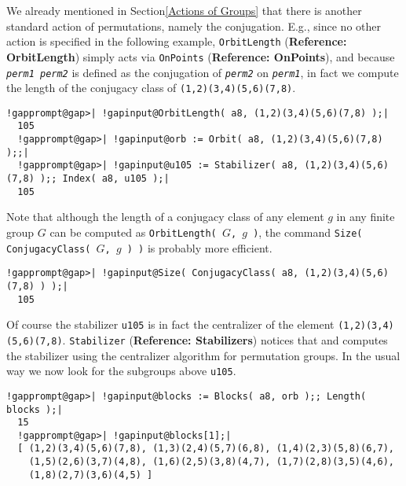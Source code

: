 \documentclass[a4paper,11pt]{report}
\begin{document}
{{ We already mentioned in Section{\nobreakspace}\ref{Actions of Groups} that there is another standard action of permutations, namely the conjugation.
E.g., since no other action is specified in the following example, \texttt{OrbitLength} (\textbf{Reference: OrbitLength}) simply acts via \texttt{OnPoints} (\textbf{Reference: OnPoints}), and because \mbox{\texttt{\mdseries\slshape perm{\textunderscore}1}}\texttt{ \texttt{} }\mbox{\texttt{\mdseries\slshape perm{\textunderscore}2}} is defined as the conjugation of \mbox{\texttt{\mdseries\slshape perm{\textunderscore}2}} on \mbox{\texttt{\mdseries\slshape perm{\textunderscore}1}}, in fact we compute the length of the conjugacy class of \texttt{(1,2)(3,4)(5,6)(7,8)}. 

 
\begin{Verbatim}[commandchars=!@|,fontsize=\small,frame=single,label=Example]
  !gapprompt@gap>| !gapinput@OrbitLength( a8, (1,2)(3,4)(5,6)(7,8) );|
  105
  !gapprompt@gap>| !gapinput@orb := Orbit( a8, (1,2)(3,4)(5,6)(7,8) );;|
  !gapprompt@gap>| !gapinput@u105 := Stabilizer( a8, (1,2)(3,4)(5,6)(7,8) );; Index( a8, u105 );|
  105
\end{Verbatim}
 

 Note that although the length of a conjugacy class of any element $g$ in any finite group $G$ can be computed as \texttt{OrbitLength( }$G$\texttt{, }$g$\texttt{ )}, the command \texttt{Size( ConjugacyClass( }$G$\texttt{, }$g$\texttt{ ) )} is probably more efficient. 

 
\begin{Verbatim}[commandchars=!@|,fontsize=\small,frame=single,label=Example]
  !gapprompt@gap>| !gapinput@Size( ConjugacyClass( a8, (1,2)(3,4)(5,6)(7,8) ) );|
  105
\end{Verbatim}
 

 Of course the stabilizer \texttt{u105} is in fact the centralizer of the element \texttt{(1,2)(3,4)(5,6)(7,8)}. \texttt{Stabilizer} (\textbf{Reference: Stabilizers}) notices that and computes the stabilizer using the centralizer algorithm for
permutation groups. In the usual way we now look for the subgroups above \texttt{u105}. 

 
\begin{Verbatim}[commandchars=!@|,fontsize=\small,frame=single,label=Example]
  !gapprompt@gap>| !gapinput@blocks := Blocks( a8, orb );; Length( blocks );|
  15
  !gapprompt@gap>| !gapinput@blocks[1];|
  [ (1,2)(3,4)(5,6)(7,8), (1,3)(2,4)(5,7)(6,8), (1,4)(2,3)(5,8)(6,7), 
    (1,5)(2,6)(3,7)(4,8), (1,6)(2,5)(3,8)(4,7), (1,7)(2,8)(3,5)(4,6), 
    (1,8)(2,7)(3,6)(4,5) ]
\end{Verbatim}
 

}}
\end{document}
